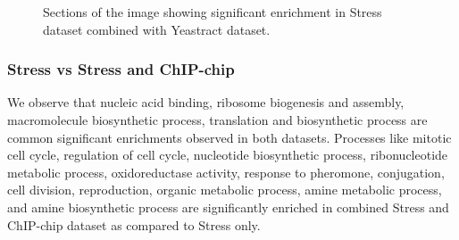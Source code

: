 \begin{figure}[p]
\centering
{}
\caption{Sections of the image showing significant enrichment in Stress dataset combined with Yeastract dataset.}
\label{fig:maxent_stress_yt_enrich}
\end{figure}

\subsubsection{Stress vs Stress and ChIP-chip}
We observe that nucleic acid binding, ribosome biogenesis and assembly, macromolecule biosynthetic process, translation and biosynthetic process are 
common significant enrichments observed in both datasets. Processes like mitotic cell cycle, regulation of cell cycle, nucleotide biosynthetic process, 
ribonucleotide metabolic process, oxidoreductase activity, response to pheromone, conjugation, cell division, reproduction, organic metabolic process, 
amine metabolic process, and amine biosynthetic process are significantly enriched in combined Stress and ChIP-chip dataset as compared to Stress only.


